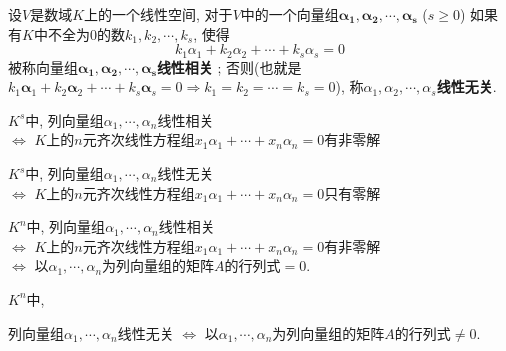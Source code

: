 \begin{Definition}[线性相关]
设$V$是数域$K$上的一个线性空间, 对于$V$中的一个向量组$\mathbf{\alpha_1}, \mathbf{\alpha_2}, \cdots, \mathbf{\alpha_s}$ ($s \ge 0$)
如果有$K$中不全为$0$的数$k_1, k_2, \cdots, k_s$, 使得
$$
k_1 \alpha_1 + k_2 \alpha_2 + \cdots + k_s \alpha_s = 0
$$
被称向量组$\mathbf{\alpha_1}, \mathbf{\alpha_2}, \cdots, \mathbf{\alpha_s}$\textbf{线性相关} 
; 否则(也就是$k_1 \mathbf{\alpha}_1 + k_2 \mathbf{\alpha}_2 + \cdots + k_s \mathbf{\alpha}_s = 0 \Rightarrow k_1 = k_2 = \cdots = k_s = 0$), 称$\alpha_1, \alpha_2, \cdots, \alpha_s$\textbf{线性无关}.
\end{Definition}

\begin{Note}[!]
$K^s$中, 列向量组$\alpha_1, \cdots, \alpha_n$线性相关 \\
$\Leftrightarrow$ $K$上的$n$元齐次线性方程组$x_1 \alpha_1 + \cdots +x_n \alpha_n = 0$有非零解
\end{Note}

\begin{Note}[!]
$K^s$中, 列向量组$\alpha_1, \cdots, \alpha_n$线性无关 \\
$\Leftrightarrow$ $K$上的$n$元齐次线性方程组$x_1 \alpha_1  + \cdots +x_n \alpha_n = 0$只有零解
\end{Note}

\begin{Note}
$K^{n}$中, 列向量组$\alpha_1, \cdots, \alpha_n$线性相关 \\
$\Leftrightarrow$ $K$上的$n$元齐次线性方程组$x_1 \alpha_1 + \cdots +x_n \alpha_n = 0$有非零解 \\
$\Leftrightarrow$ 以$\alpha_1, \cdots, \alpha_n$为列向量组的矩阵$A$的行列式$=0$.
\end{Note}

\begin{Note}[!!!!]
$K^{n}$中, 
\begin{tightcenter}
列向量组$\alpha_1, \cdots, \alpha_n$线性无关
$\Leftrightarrow$ 以$\alpha_1, \cdots, \alpha_n$为列向量组的矩阵$A$的行列式$\neq 0$.
\end{tightcenter}
\end{Note}


